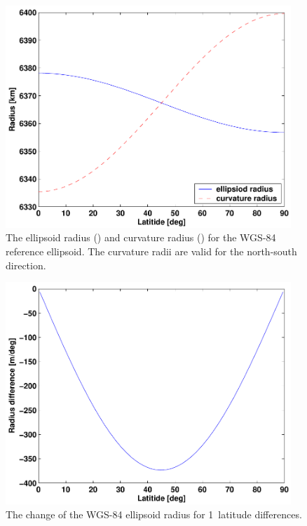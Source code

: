 \begin{figure}
 \begin{minipage}[c]{0.65\textwidth}
 \includegraphics*[width=0.96\textwidth]{wgs84_radii}
 \end{minipage}%
 \begin{minipage}[c]{0.35\textwidth}
  \caption{The ellipsoid radius (\aRds{\odot}) and curvature radius ()
    for the
    WGS-84 reference ellipsoid. The curvature radii are valid for the
    north-south direction.}
  \label{fig:ppath:wgs84radii}
 \end{minipage}%
\end{figure}   
        
\begin{figure}
 \begin{minipage}[c]{0.65\textwidth}
 \includegraphics*[width=0.96\textwidth]{wgs84_latdiff}
 \end{minipage}%
 \begin{minipage}[c]{0.35\textwidth}
  \caption{The change of the WGS-84 ellipsoid radius for  1\degree\ 
            latitude differences.}
  \label{fig:ppath:latdiff}
 \end{minipage}%
\end{figure}   

